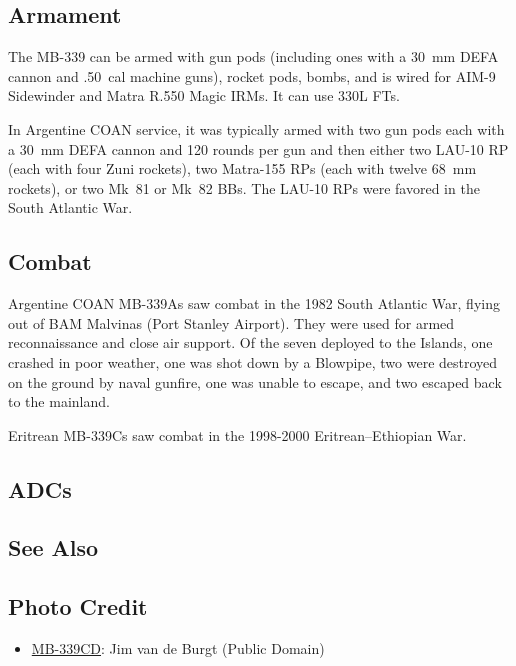 \subsection{Armament}

The MB-339 can be armed with gun pods (including ones with a 30~mm DEFA cannon and .50~cal machine guns), rocket pods, bombs, and is wired for AIM-9 Sidewinder and Matra R.550 Magic IRMs. It can use 330L FTs.

In Argentine COAN service, it was typically armed with two gun pods each with a 30~mm DEFA cannon and 120 rounds per gun and then either two LAU-10 RP (each with four Zuni rockets), two Matra-155 RPs (each with twelve 68~mm rockets), or two Mk~81 or Mk~82 BBs. The LAU-10 RPs were favored in the South Atlantic War.

\subsection{Combat}

Argentine COAN MB-339As saw combat in the 1982 South Atlantic War, flying out of BAM Malvinas (Port Stanley Airport). They were used for armed reconnaissance and close air support. Of the seven deployed to the Islands, one crashed in poor weather, one was shot down by a Blowpipe, two were destroyed on the ground by naval gunfire, one was unable to escape, and two escaped back to the mainland.

Eritrean MB-339Cs saw combat in the 1998-2000 Eritrean–Ethiopian War.

\subsection{ADCs}
\begin{adclist}
\end{adclist}

\subsection{See Also}
\begin{typelist}
\end{typelist}

\subsection{Photo Credit}
\begin{itemize}\raggedright
    \item \href{https://commons.wikimedia.org/wiki/File:61-160,_2007,_Italy,_Kleine-Brogel,_MB-339CD,_MM55088_-_1020400_(54042205628).jpg}{MB-339CD}: Jim van de Burgt (Public Domain)
\end{itemize}
